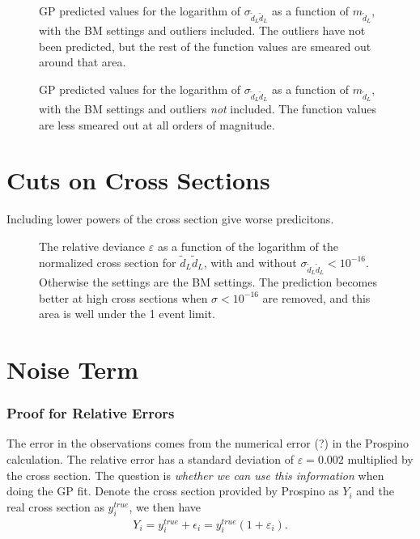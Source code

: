\documentclass[twoside,english]{uiofysmaster}
\begin{document}
\begin{figure}[H]
\caption{GP predicted values for the logarithm of $\sigma_{\tilde{d}_L \tilde{d}_L}$ as a function of $m_{\tilde{d}_L}$, with the BM settings and outliers included. The outliers have not been predicted, but the rest of the function values are smeared out around that area.}
\label{Fig:: evaluating cross : sigma mq predicted with outliers}
\end{figure}



\begin{figure}[H]
\caption{GP predicted values for the logarithm of $\sigma_{\tilde{d}_L \tilde{d}_L}$ as a function of $m_{\tilde{d}_L}$, with the BM settings and outliers \textit{not} included. The function values are less smeared out at all orders of magnitude.}
\label{Fig:: ms mat44m2 zeros nozeros}
\end{figure}



\section{Cuts on Cross Sections}

Including lower powers of the cross section give worse predicitons.

\begin{figure}[H]
\centering
\caption{The relative deviance $\varepsilon$ as a function of the logarithm of the normalized cross section for $\tilde{d}_L \tilde{d}_L$, with and without $\sigma_{\tilde{d}_L \tilde{d}_L} < 10^{-16}$. Otherwise the settings are the BM settings. The prediction becomes better at high cross sections when $\sigma < 10^{-16}$ are removed, and this area is well under the 1 event limit.}
\end{figure}


\section{Noise Term}

\subsubsection{Proof for Relative Errors}

The error in the observations comes from the numerical error (?) in the Prospino calculation. The relative error has a standard deviation of $\varepsilon = 0.002$ multiplied by the cross section. The question is \textit{whether we can use this information} when doing the GP fit. Denote the cross section provided by Prospino as $Y_i$ and the real cross section as $y_i^{true}$, we then have
\begin{align}\label{Eq:: cross section w/ error}
Y_i = y^{true}_i + \epsilon_i = y_i^{true}(1 + \varepsilon_i).
\end{align}
\end{document}
